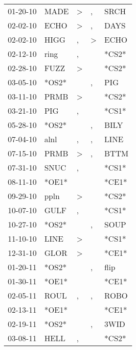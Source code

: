 \begin{supertabular}{lllll}
 01-20-10 &   MADE &     \textgreater &                , &   SRCH \\
 02-02-10 &   ECHO &     \textgreater &                , &   DAYS \\
 02-02-10 &   HIGG &                , &     \textgreater &   ECHO \\
 02-12-10 &   ring &                , &                  &  *CS2* \\
 02-28-10 &   FUZZ &     \textgreater &                  &  *CS2* \\
 03-05-10 &  *OS2* &                  &                , &    PIG \\
 03-11-10 &   PRMB &     \textgreater &                  &  *CS2* \\
 03-21-10 &    PIG &                , &                  &  *CS1* \\
 05-28-10 &  *OS2* &                  &                , &   BILY \\
 07-04-10 &   alnl &                , &                , &   LINE \\
 07-15-10 &   PRMB &     \textgreater &                , &   BTTM \\
 07-31-10 &   SNUC &                , &                  &  *CS1* \\
 08-11-10 &  *OE1* &                  &                  &  *CE1* \\
 09-29-10 &   ppln &     \textgreater &                  &  *CS2* \\
 10-07-10 &   GULF &                , &                  &  *CS1* \\
 10-27-10 &  *OS2* &                  &                , &   SOUP \\
 11-10-10 &   LINE &     \textgreater &                  &  *CS1* \\
 12-31-10 &   GLOR &     \textgreater &                  &  *CE1* \\
 01-20-11 &  *OS2* &                  &                , &   flip \\
 01-30-11 &  *OE1* &                  &                  &  *CE1* \\
 02-05-11 &   ROUL &                , &                , &   ROBO \\
 02-13-11 &  *OE1* &                  &                  &  *CE1* \\
 02-19-11 &  *OS2* &                  &                , &   3WID \\
 03-08-11 &   HELL &                , &                  &  *CS2* \\

\end{supertabular}

